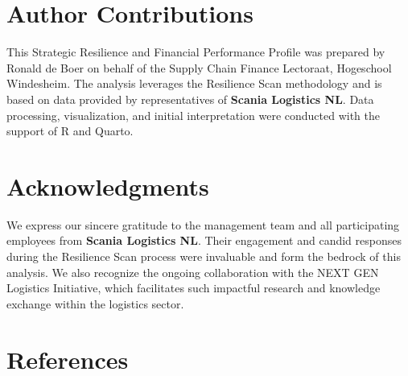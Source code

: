 \documentclass[
  oneside,
  open=any,
  fontsize=11pt]{scrbook}
\begin{document}
\chapter{Author Contributions}\label{author-contributions}

This Strategic Resilience and Financial Performance Profile was prepared
by Ronald de Boer on behalf of the Supply Chain Finance Lectoraat,
Hogeschool Windesheim. The analysis leverages the Resilience Scan
methodology and is based on data provided by representatives of
\textbf{Scania Logistics NL}. Data processing, visualization, and
initial interpretation were conducted with the support of R and Quarto.

\chapter{Acknowledgments}\label{acknowledgments}

We express our sincere gratitude to the management team and all
participating employees from \textbf{Scania Logistics NL}. Their
engagement and candid responses during the Resilience Scan process were
invaluable and form the bedrock of this analysis. We also recognize the
ongoing collaboration with the NEXT GEN Logistics Initiative, which
facilitates such impactful research and knowledge exchange within the
logistics sector.

\chapter{References}\label{references}

\label{refs}


\backmatter
\end{document}
